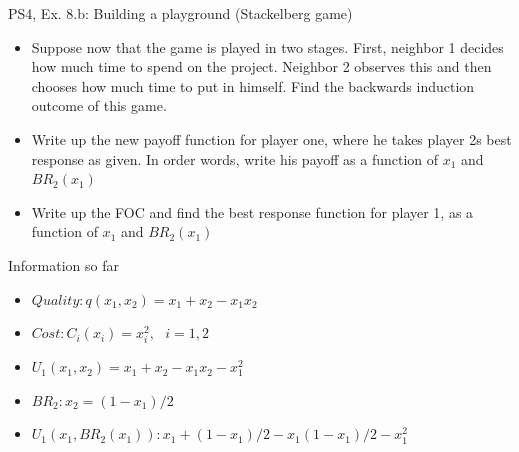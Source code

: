 \begin{frame}{PS4, Ex. 8.b: Building a playground (Stackelberg game)}
    \begin{itemize}
    \item[(b)] Suppose now that the game is played in two stages. First, neighbor 1 decides how much time to spend on the project. Neighbor 2 observes this and then chooses how much time to put in himself. Find the backwards induction outcome of this game.
    \end{itemize}
    \vfill\null
  \begin{multicols}{2}
    \begin{itemize}
      \item[(Step 1)] Write up the new payoff function for player one, where he takes player 2s best response as given. In order words, write his payoff as a function of \begin{math}x_1\end{math} and \begin{math}BR_2(x_1)\end{math}
      \item[(Step 2)] Write up the FOC and find the best response function for player 1, as a function of \begin{math}x_1\end{math} and \begin{math}BR_2(x_1)\end{math}
    \end{itemize}
    \vfill\null \columnbreak
    Information so far
    \begin{itemize}
      \item[1] \begin{math}Quality: q(x_1,x_2)=x_1+x_2-x_1x_2 \end{math}
      \item[2] \begin{math}Cost: C_i(x_i)=x_i^2,\ \ \ i=1,2  \end{math}
      \item[3] \begin{math}U_1(x_1,x_2)=x_1+x_2-x_1x_2-x_1^2 \end{math}
      \item[4] \begin{math}BR_2: x_2=(1-x_1)/2 \end{math}
      \item[5] \begin{math}U_1(x_1,BR_2(x_1)): x_1+(1-x_1)/2-x_1(1-x_1)/2-x_1^2 \end{math}
    \end{itemize}
    \vfill\null
  \end{multicols}
\end{frame}
